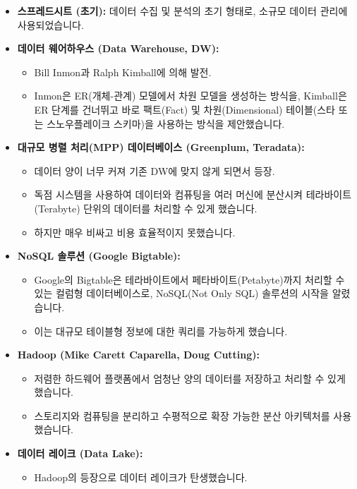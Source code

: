 \documentclass[11pt,a4paper]{article}
\theoremstyle{definition}
\begin{document}
\begin{itemize}
    \item \textbf{스프레드시트 (초기):} 데이터 수집 및 분석의 초기 형태로, 소규모 데이터 관리에 사용되었습니다.
    \item \textbf{데이터 웨어하우스 (Data Warehouse, DW):}
    \begin{itemize}
        \item Bill Inmon과 Ralph Kimball에 의해 발전.
        \item Inmon은 ER(개체-관계) 모델에서 차원 모델을 생성하는 방식을, Kimball은 ER 단계를 건너뛰고 바로 팩트(Fact) 및 차원(Dimensional) 테이블(스타 또는 스노우플레이크 스키마)을 사용하는 방식을 제안했습니다.
    \end{itemize}
    \item \textbf{대규모 병렬 처리(MPP) 데이터베이스 (Greenplum, Teradata):}
    \begin{itemize}
        \item 데이터 양이 너무 커져 기존 DW에 맞지 않게 되면서 등장.
        \item 독점 시스템을 사용하여 데이터와 컴퓨팅을 여러 머신에 분산시켜 테라바이트(Terabyte) 단위의 데이터를 처리할 수 있게 했습니다.
        \item 하지만 매우 비싸고 비용 효율적이지 못했습니다.
    \end{itemize}
    \item \textbf{NoSQL 솔루션 (Google Bigtable):}
    \begin{itemize}
        \item Google의 Bigtable은 테라바이트에서 페타바이트(Petabyte)까지 처리할 수 있는 컬럼형 데이터베이스로, NoSQL(Not Only SQL) 솔루션의 시작을 알렸습니다.
        \item 이는 대규모 테이블형 정보에 대한 쿼리를 가능하게 했습니다.
    \end{itemize}
    \item \textbf{Hadoop (Mike Carett Caparella, Doug Cutting):}
    \begin{itemize}
        \item 저렴한 하드웨어 플랫폼에서 엄청난 양의 데이터를 저장하고 처리할 수 있게 했습니다.
        \item 스토리지와 컴퓨팅을 분리하고 수평적으로 확장 가능한 분산 아키텍처를 사용했습니다.
    \end{itemize}
    \item \textbf{데이터 레이크 (Data Lake):}
    \begin{itemize}
        \item Hadoop의 등장으로 데이터 레이크가 탄생했습니다.

\end{itemize}
\end{itemize}
\end{document}
